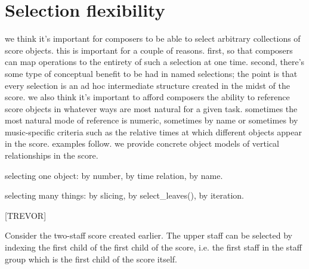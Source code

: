 \documentclass{article}
\begin{document}

\section{Selection flexibility} \label{sec:selections}

we think it's important for composers to be able to select arbitrary
collections of score objects. this is important for a couple of reasons. first,
so that composers can map operations to the entirety of such a selection at one
time. second, there's some type of conceptual benefit to be had in named
selections; the point is that every selection is an ad hoc intermediate
structure created in the midst of the score. we also think it's important to
afford composers the ability to reference score objects in whatever ways are
most natural for a given task. sometimes the most natural mode of reference is
numeric, sometimes by name or sometimes by music-specific criteria such as the
relative times at which different objects appear in the score. examples follow.
we provide concrete object models of vertical relationships in the score.

selecting one object: by number, by time relation, by name.

selecting many things: by slicing, by select\_leaves(), by iteration.

[TREVOR]


Consider the two-staff score created earlier. The upper staff can be selected
by indexing the first child of the first child of the score, i.e. the first
staff in the staff group which is the first child of the score itself.
\end{document}
